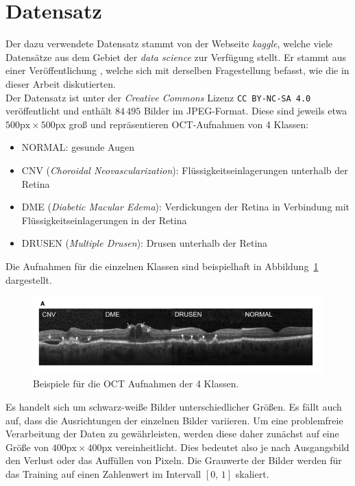 \section{Datensatz}
%
Der dazu verwendete Datensatz stammt von der Webseite \textit{kaggle}, welche
viele Datensätze aus dem Gebiet der \textit{data science} zur Verfügung stellt.
Er stammt aus einer Veröffentlichung \cite{paper}, welche sich mit derselben
Fragestellung befasst, wie die in dieser Arbeit diskutierten. \\
Der Datensatz ist unter der \textit{Creative Commons} Lizenz
\texttt{CC BY-NC-SA 4.0} veröffentlicht und enthält $84\,495$ Bilder im
JPEG-Format. Diese sind jeweils etwa $500\text{px}\times500\text{px}$ groß
und repräsentieren OCT-Aufnahmen von 4 Klassen:
%
\begin{itemize}
  \item NORMAL: gesunde Augen
  \item CNV (\textit{Choroidal Neovascularization}): Flüssigkeitseinlagerungen unterhalb der Retina
  \item DME (\textit{Diabetic Macular Edema}): Verdickungen der Retina in Verbindung mit Flüssigkeitseinlagerungen in der Retina
  \item DRUSEN (\textit{Multiple Drusen}): Drusen unterhalb der Retina
\end{itemize}
%
Die Aufnahmen für die einzelnen Klassen sind beispielhaft in
Abbildung~\ref{fig:scans} dargestellt.
%
\begin{figure}
  \centering
  \includegraphics[width=1.1\textwidth]{Plots/title.png}
  \caption{Beispiele für die OCT Aufnahmen der 4 Klassen.}
  \label{fig:scans}
\end{figure}
%
Es handelt sich um schwarz-weiße Bilder unterschiedlicher Größen. Es fällt auch
auf, dass die Ausrichtungen der einzelnen Bilder variieren. Um eine problemfreie
Verarbeitung der Daten zu gewährleisten, werden diese daher zunächst auf eine
Größe von $400\text{px}\times400\text{px}$ vereinheitlicht. Dies bedeutet also
je nach Ausgangsbild den Verlust oder das Auffüllen von Pixeln. Die Grauwerte
der Bilder werden für das Training auf einen Zahlenwert im Intervall $[0,\,1]$
skaliert.
